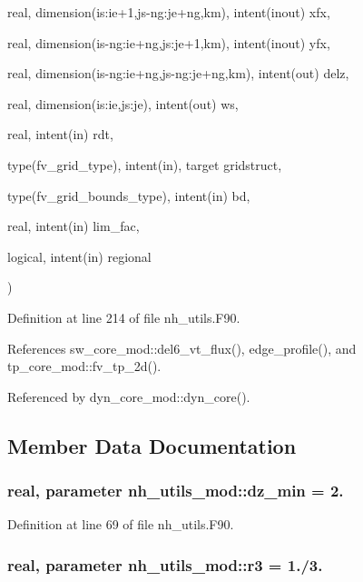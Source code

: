 {\begin{DoxyParamCaption}
\item[{real, dimension(is\-:ie+1,js-\/ng\-:je+ng,km), intent(inout)}]{xfx, }
\item[{real, dimension(is-\/ng\-:ie+ng,js\-:je+1,km), intent(inout)}]{yfx, }
\item[{real, dimension(is-\/ng\-:ie+ng,js-\/ng\-:je+ng,km), intent(out)}]{delz, }
\item[{real, dimension(is\-:ie,js\-:je), intent(out)}]{ws, }
\item[{real, intent(in)}]{rdt, }
\item[{type(fv\-\_\-grid\-\_\-type), intent(in), target}]{gridstruct, }
\item[{type(fv\-\_\-grid\-\_\-bounds\-\_\-type), intent(in)}]{bd, }
\item[{real, intent(in)}]{lim\-\_\-fac, }
\item[{logical, intent(in)}]{regional}
\end{DoxyParamCaption}
)}\label{classnh__utils__mod_adf32b4a88ce6240d9debfd3349995f83}


Definition at line 214 of file nh\-\_\-utils.\-F90.



References sw\-\_\-core\-\_\-mod\-::del6\-\_\-vt\-\_\-flux(), edge\-\_\-profile(), and tp\-\_\-core\-\_\-mod\-::fv\-\_\-tp\-\_\-2d().



Referenced by dyn\-\_\-core\-\_\-mod\-::dyn\-\_\-core().



\subsection{Member Data Documentation}
\subsubsection[{dz\-\_\-min}]{\setlength{\rightskip}{0pt plus 5cm}real, parameter nh\-\_\-utils\-\_\-mod\-::dz\-\_\-min = 2.\hspace{0.3cm}{\ttfamily [private]}}\label{classnh__utils__mod_a29df8f0c8a425db2e38a865d131ae9bb}


Definition at line 69 of file nh\-\_\-utils.\-F90.

\subsubsection[{r3}]{\setlength{\rightskip}{0pt plus 5cm}real, parameter nh\-\_\-utils\-\_\-mod\-::r3 = 1./3.\hspace{0.3cm}{\ttfamily [private]}}\label{classnh__utils__mod_a11855ede9ba4e45e0e95746e9aa50699}


